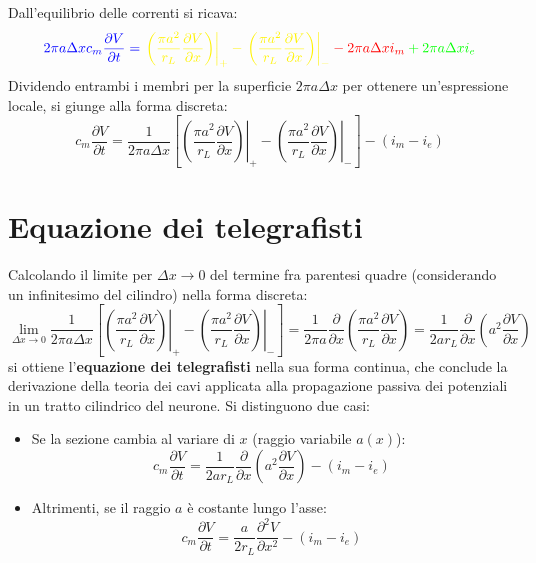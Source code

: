 Dall'equilibrio delle correnti si ricava:
\begin{equation}
    \color{blue} 2\pi a \Delta x c_m \frac{\partial V}{\partial t} = \color{yellow} \left.\left(\frac{\pi a^2}{r_L}\frac{\partial V}{\partial x}\right)\right|_{+} - \left.\left(\frac{\pi a^2}{r_L}\frac{\partial V}{\partial x}\right)\right|_{-} \color{red} - 2\pi a \Delta x i_m \color{green}+ 2\pi a \Delta x i_e \color{black}
\end{equation}
Dividendo entrambi i membri per la superficie $2\pi a \Delta x$ per ottenere un'espressione locale, si giunge alla forma discreta:
\begin{equation}
    c_m \frac{\partial V}{\partial t} = \frac{1}{2\pi a \Delta x} \left[ \left.\left(\frac{\pi a^2}{r_L}\frac{\partial V}{\partial x}\right)\right|_{+} - \left.\left(\frac{\pi a^2}{r_L}\frac{\partial V}{\partial x}\right)\right|_{-} \right] - (i_m - i_e)
\end{equation}

\section{Equazione dei telegrafisti}
Calcolando il limite per $\Delta x \to 0$ del termine fra parentesi quadre (considerando un infinitesimo del cilindro) nella forma discreta:
\begin{equation}
    \lim_{\Delta x \to 0} \frac{1}{2\pi a \Delta x} \left[ \left.\left(\frac{\pi a^2}{r_L}\frac{\partial V}{\partial x}\right)\right|_{+} - \left.\left(\frac{\pi a^2}{r_L}\frac{\partial V}{\partial x}\right)\right|_{-} \right] = \frac{1}{2\pi a}\frac{\partial}{\partial x}\left(\frac{\pi a^2}{r_L}\frac{\partial V}{\partial x}\right) = \frac{1}{2 a r_L}\frac{\partial}{\partial x}\left(a^2 \frac{\partial V}{\partial x}\right)
\end{equation}
si ottiene l'\textbf{equazione dei telegrafisti} nella sua forma continua, che conclude la derivazione della teoria dei cavi applicata alla propagazione passiva dei potenziali in un tratto cilindrico del neurone. Si distinguono due casi:
\begin{itemize}
    \item Se la sezione cambia al variare di $x$ (raggio variabile $a(x)$):
    \begin{equation}
        c_m \frac{\partial V}{\partial t} = \frac{1}{2 a r_L} \frac{\partial}{\partial x}\left(a^2 \frac{\partial V}{\partial x}\right) - (i_m - i_e)
    \end{equation}
    \item Altrimenti, se il raggio $a$ è costante lungo l'asse:
    \begin{equation}
        c_m \frac{\partial V}{\partial t} = \frac{a}{2 r_L} \frac{\partial^2 V}{\partial x^2} - (i_m - i_e)
    \end{equation}
\end{itemize}

